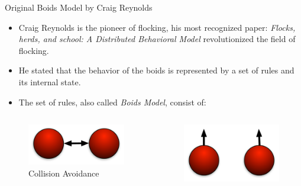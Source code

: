 \documentclass[red]{beamer}
\begin{document}
\begin{frame}{Original Boids Model by Craig Reynolds}
	\begin{itemize}
		\pause \item Craig Reynolds is the pioneer of flocking, his most recognized paper: \textit{Flocks, herds, and school: A Distributed Behavioral Model} revolutionized the field of flocking.
		\pause \item He stated that the behavior of the boids is represented by a set of rules and its internal state.
		\pause \item The set of rules, also called \textit{Boids Model}, consist of:	
	\end{itemize}
	
	\begin{columns}[b]
		\pause
		\begin{column}{4cm}
			\begin{figure}[htbp]
			\begin{center}
			\includegraphics[scale=0.1]{../figures/sep_Craig.pdf}
			\caption{Collision Avoidance}
			\end{center}
			\end{figure}
		\end{column}
		\pause
		\begin{column}{4cm}
			\begin{figure}[htbp]
			\begin{center}
			\includegraphics[scale=0.1]{../figures/align_Craig.pdf}

\end{center}
\end{figure}
\end{column}
\end{columns}
\end{frame}
\end{document}
